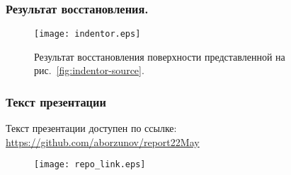 \documentclass{beamer}
\begin{document}
\begin{frame}
    \frametitle{Результат восстановления.}
    \begin{figure}
        \texttt{[image: indentor.eps]}
        \caption{Результат восстановления поверхности представленной на рис.~\ref{fig:indentor-source}.}
        {\label{fig:indentor}}%
    \end{figure}
\end{frame}

\begin{frame}[allowframebreaks]
    
\end{frame}

\begin{frame}
    \frametitle{Текст презентации}
    Текст презентации доступен по ссылке:
    \url{https://github.com/aborzunov/report22May}
    \begin{figure}
        \texttt{[image: repo\_link.eps]}
        {\label{fig:indentor}}%
    \end{figure}

\end{frame}
\end{document}
